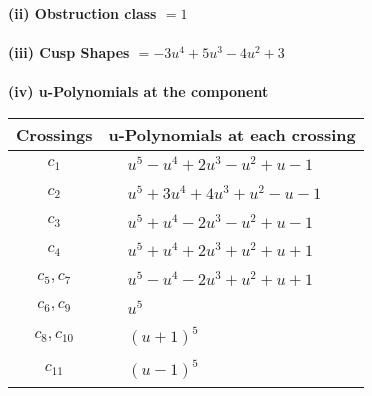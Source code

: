 \documentclass[1p]{elsarticle_modified}
\theoremstyle{definition}
\begin{document}
\flushleft \textbf{(ii) Obstruction class $= 1$}\\~\\
\flushleft \textbf{(iii) Cusp Shapes $= -3 u^4+5 u^3-4 u^2+3$}\\~\\
\newpage\renewcommand{\arraystretch}{1}
\flushleft \textbf{(iv) u-Polynomials at the component}\newline \\
\begin{tabular}{m{50pt}|m{274pt}}
Crossings & \hspace{64pt}u-Polynomials at each crossing \\
\hline $$\begin{aligned}c_{1}\end{aligned}$$&$\begin{aligned}
&u^5- u^4+2 u^3- u^2+u-1
\end{aligned}$\\
\hline $$\begin{aligned}c_{2}\end{aligned}$$&$\begin{aligned}
&u^5+3 u^4+4 u^3+u^2- u-1
\end{aligned}$\\
\hline $$\begin{aligned}c_{3}\end{aligned}$$&$\begin{aligned}
&u^5+u^4-2 u^3- u^2+u-1
\end{aligned}$\\
\hline $$\begin{aligned}c_{4}\end{aligned}$$&$\begin{aligned}
&u^5+u^4+2 u^3+u^2+u+1
\end{aligned}$\\
\hline $$\begin{aligned}c_{5},c_{7}\end{aligned}$$&$\begin{aligned}
&u^5- u^4-2 u^3+u^2+u+1
\end{aligned}$\\
\hline $$\begin{aligned}c_{6},c_{9}\end{aligned}$$&$\begin{aligned}
&u^5
\end{aligned}$\\
\hline $$\begin{aligned}c_{8},c_{10}\end{aligned}$$&$\begin{aligned}
&(u+1)^5
\end{aligned}$\\
\hline $$\begin{aligned}c_{11}\end{aligned}$$&$\begin{aligned}
&(u-1)^5
\end{aligned}$\\
\hline
\end{tabular}\\~\\
\end{document}
